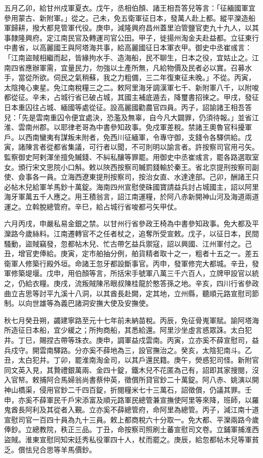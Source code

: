 \begin{pinyinscope}
 五月乙卯，給甘州戍軍夏衣。戊午，丞相伯顏、諸王相吾答兒等言：「征緬國軍宜參用蒙古、新附軍。」從之。己未，免五衛軍征日本，發萬人赴上都。縱平灤造船軍歸耕，撥大都見管軍代役。庚申，減隆興府昌州蓋里泊管鹽官吏九十九人，以其事隸隆興府。定江南民官及轉運司官公田。甲子，徙揚州淘金夫赴益都。立征東行中書省，以高麗國王與阿塔海共事，給高麗國征日本軍衣甲。御史中丞崔彧言：「江南盜賊相繼而起，皆緣拘水手、造海船，民不聊生，日本之役，宜姑止之。江南四省應辦軍需，宜量民力，勿強以土產所無，凡給物價及民者必以實。召募水手，當從所欲。伺民之氣稍蘇，我之力粗備，三二年復東征未晚。」不從。丙寅，太陰掩心東星。免江南稅糧三之二。敕阿里海牙調漢軍七千、新附軍八千，以附唆都從征。辛未，占城行省已破占城，其國主補底遁去，降璽書招徠之。甲戌，發征日本重囚往占城、緬國等處從征。設高麗國勸農官四員。丙子，詔諭諸王相吾答兒：「先是雲南重囚令便宜處決，恐濫及無辜，自今凡大闢罪，仍須待報。」並省江淮、雲南州郡。以耶律老哥為中書參知政事。免戍軍差稅。禁諸王奧魯官科擾軍戶。以西南蠻夷有謀叛未附者，免西川征緬軍，令專守御，支錢令各驛供給。戊寅，諸陳言者從都省集議，可行者以聞，不可則明以諭言者。許按察司官用弓矢。監察御史阿剌渾坐擅免贓錢、不糾私釀等罪罷。用御史中丞崔彧言，罷各路選取室女。頒行宋文思院小口斛。敕以陜西按察司贓罰錢輸於秦王。省北京提刑按察司副使、僉事各一員。立海西遼東提刑按察司，按治女直、水達達部。己卯，酬諸王只必帖木兒給軍羊馬鈔十萬錠。海南四州宣慰使硃國寶請益兵討占城國主，詔以阿里海牙軍萬五千人應之。用王積翁言，詔江南運糧，於阿八赤新開神山河及海道兩道運之。立斡脫總管府。辛巳，給占城行省唆都弓矢甲仗。



 六月丙戌，申嚴私易金銀之禁。以甘州行省參政王椅為中書參知政事。免大都及平灤路今歲絲料。江南遷轉官不之任者杖之，追奪所受宣敕。戊子，以征日本，民間騷動，盜賊竊發，忽都帖木兒、忙古帶乞益兵禦寇，詔以興國、江州軍付之。己丑，增官吏俸給。庚寅，定市舶抽分例，舶貨精者取十之一，粗者十五之一。差五衛軍人修築行殿外垣。命諸王忽牙都設斷事官。丙申，發軍修完大都城。辛丑，發軍修築堤堰。戊申，用伯顏等言，所括宋手號軍八萬三千六百人，立牌甲設官以統之，仍給衣糧。庚戌，流叛賊陳吊眼叔陳桂龍於憨答孫之地。辛亥，四川行省參政曲立吉思等討平九溪十八洞，以其酋長赴闕，定其地，立州縣，聽順元路宣慰司節制。以向世雄等為義巴諸洞安撫大使及安撫使。



 秋七月癸丑朔，蠲建寧路至元十七年前未納苗稅。丙辰，免征骨嵬軍賦。諭阿塔海所造征日本船，宜少緩之；所拘商船，其悉給還。阿里沙坐虛言惑眾誅。太白犯井。丁巳，賜捏古帶等珠衣。庚申，調軍益戍雲南。丙寅，立亦奚不薛宣慰司，益兵戍守。開雲南驛路。分亦奚不薛地為三，設官撫治之。癸亥，太陰犯南斗。乙丑，太白犯井。丁卯，罷淮南淘金司，以其戶還民籍。庚午，熒惑犯司怪。新附官同文英入見，其贄禮銀萬兩、金四十錠，鐵木兒不花匿為己有，詔即其家搜閱，沒入官帑。敕捕阿合馬婦翁尚書蔡仲英，徵償所貸官鈔二十萬錠。阿八赤、姚演以開神山橋渠，侵用官鈔二千四百錠，折閱糧米七十三萬石，詔徵償，仍議其罪。壬申，亦奚不薛軍民千戶宋添富及順元路軍民總管兼宣撫使阿里等來降，班師，以羅鬼酋長阿利及其從者入覲。立亦奚不薛總管府，命阿里為總管。丙子，減江南十道宣慰司官一百四十員為九十三員。敕上都商稅六十分取一。免大都、平灤兩路今歲俸鈔。立總教院，秩正三品。丁丑，命按察司照刷土蕃宣慰司文卷。立鋪軍捕淮西盜賊。淮東宣慰同知宋廷秀私役軍四十人，杖而罷之。庚辰，給忽都帖木兒等軍貧乏。償怯兒合思等羊馬價鈔。




\end{pinyinscope}
